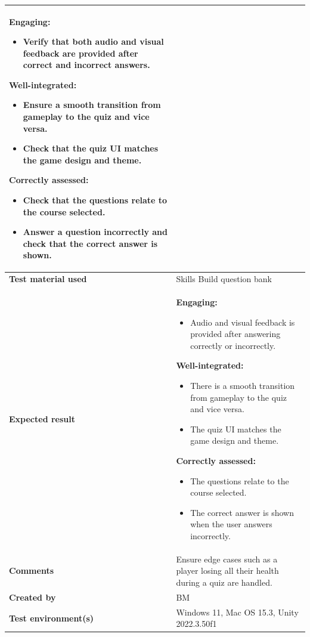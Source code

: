 \documentclass[11pt, a4paper]{article}
\begin{document}
\begin{center}
\begin{tabularx}{\linewidth}{|>{\raggedright\arraybackslash}m{4cm}|X|}
    \textbf{Engaging:}
    \begin{itemize}
        \item Verify that both audio and visual feedback are provided after correct and incorrect answers.
    \end{itemize}
    \textbf{Well-integrated:}
    \begin{itemize}
        \item Ensure a smooth transition from gameplay to the quiz and vice versa.
        \item Check that the quiz UI matches the game design and theme.
    \end{itemize}
    \textbf{Correctly assessed:}
    \begin{itemize}
        \item Check that the questions relate to the course selected.
        \item Answer a question incorrectly and check that the correct answer is shown.
    \end{itemize}
    \\
    \hline
    \textbf{Test material used} & Skills Build question bank \\
    \hline
    \textbf{Expected result} &
    \textbf{Engaging:}
    \begin{itemize}
        \item Audio and visual feedback is provided after answering correctly or incorrectly.
    \end{itemize}
    \textbf{Well-integrated:}
    \begin{itemize}
        \item There is a smooth transition from gameplay to the quiz and vice versa.
        \item The quiz UI matches the game design and theme.
    \end{itemize}
    \textbf{Correctly assessed:}
    \begin{itemize}
        \item The questions relate to the course selected.
        \item The correct answer is shown when the user answers incorrectly.
    \end{itemize}
    \\
    \hline
    \textbf{Comments} & Ensure edge cases such as a player losing all their health during a quiz are handled. \\
    \hline
    \textbf{Created by} & BM \\
    \hline
    \textbf{Test environment(s)} & Windows 11, Mac OS 15.3, Unity 2022.3.50f1 \\
    \hline
\end{tabularx}
\end{center}
\end{document}
